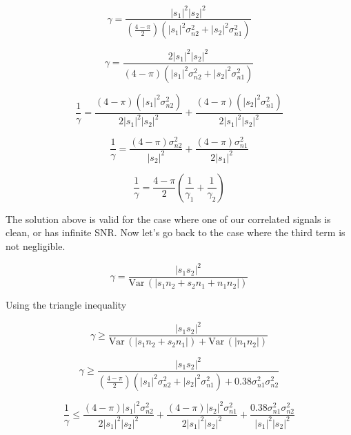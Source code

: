 \documentclass[11pt]{article}
\def\Var{{\textrm{Var}}\,}
\begin{document}
\begin{equation}
\gamma = \frac{|s_1|^2 |s_2|^2}{\left( \frac{4-\pi}{2}\right) \left( |s_1|^2 \sigma_{n2}^2 + |s_2|^2 \sigma_{n1}^2 \right)}
\end{equation}


\begin{equation}
\gamma = \frac{2|s_1|^2 |s_2|^2}{\left( 4-\pi \right) \left( |s_1|^2 \sigma_{n2}^2 + |s_2|^2 \sigma_{n1}^2 \right)}
\end{equation}


\begin{equation}
\frac{1}{\gamma}
=
\frac{(4-\pi)(|s_1|^2 \sigma_{n2}^2)}{2|s_1|^2 |s_2|^2}
+
\frac{(4-\pi)(|s_2|^2\sigma_{n1}^2)}{2|s_1|^2 |s_2|^2}
\end{equation}


\begin{equation}
\frac{1}{\gamma}
=
\frac{(4-\pi)\sigma_{n2}^2}{|s_2|^2}
+
\frac{(4-\pi)\sigma_{n1}^2}{2|s_1|^2}
\end{equation}

\begin{equation}
\boxed{
\frac{1}{\gamma}
=
\frac{4-\pi}{2}
\left(
\frac{1}{\gamma_1} + \frac{1}{\gamma_2}
\right)
}
\end{equation}

The solution above is valid for the case where one of our correlated signals is clean, or has infinite SNR. Now let's go back to the case where the third term is not negligible. 

\begin{equation}
\gamma = \frac{|s_1 s_2|^2}{\Var(|s_1 n_2 + s_2 n_1 + n_1 n_2|)}
\end{equation}

Using the triangle inequality

\begin{equation}
\gamma \geq \frac{|s_1 s_2|^2}{\Var(|s_1 n_2 + s_2 n_1|) + \Var(|n_1 n_2|)}
\end{equation}

\begin{equation}
\gamma \geq \frac{|s_1 s_2|^2}{
\left(
\frac{4-\pi}{2}
\right)
\left(
|s_1|^2 \sigma_{n2}^2 + |s_2|^2 \sigma_{n1}^2
\right)
 +
0.38 \sigma_{n1}^2 \sigma_{n2}^2}
\end{equation}


\begin{equation}
\frac{1}{\gamma}
\leq
\frac{\left( 4-\pi \right) |s_1|^2 \sigma_{n2}^2}
{2|s_1|^2|s_2|^2}
+
\frac{\left( 4-\pi \right) |s_2|^2 \sigma_{n1}^2}
{2|s_1|^2|s_2|^2}
+
\frac{0.38\sigma_{n1}^2 \sigma_{n2}^2}
{|s_1|^2|s_2|^2}
\end{equation}
\end{document}
